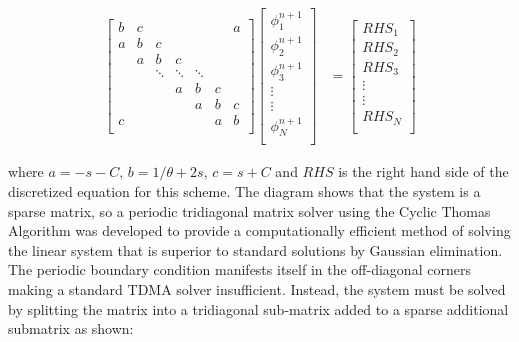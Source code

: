 \documentclass[twocolumn,10pt]{asme2ej}
\begin{document}
\begin{equation}
\begin{split}
\begin{bmatrix}
   { b } & { c } & {   }  & {   } & {   } & {   }& { a } \\
   { a } & { b } & { c }  & {   } & {   }  & {   } & {   }\\
   {   } &  { a } & { b } & { c }  & {   }  & {   } & {   }\\
   {   } & {   } & \ddots & \ddots  & \ddots & {   } &  {   } \\
   {   } & {   } & {   } & { a } & {b  } & {c  } & {   }\\
   {   } & {   } & {   } & {   } & {a  } & {b  } & { c }\\
   { c } & {   } & {   } & {   } & {   }  &  { a }  & { b }\\
\end{bmatrix}
\begin{bmatrix}
   {\phi_1^{n+1} }  \\
   {\phi_2^{n+1 }}  \\
   {\phi_3^{n+1} }  \\
   \vdots   \\
   \vdots   \\
   {\phi_N^{n+1} }  \\
\end{bmatrix}
& =
\begin{bmatrix}
   {RHS_1 }  \\
   {RHS_2 }  \\
   {RHS_3 }  \\
   \vdots   \\
   \vdots   \\
   {RHS_N }  \\
\end{bmatrix}
\end{split}
\label{TriPerSys}
\end{equation}

\noindent where $a = -s-C,\, b = 1/\theta+2s,\, c=s+C$ and $RHS$ is the right hand side of the discretized equation for this scheme.
\noindent The diagram shows that the system is a sparse matrix, so a periodic tridiagonal matrix solver using the Cyclic Thomas Algorithm was developed to provide a computationally efficient method of solving the linear system that is superior to standard solutions by Gaussian elimination.  The periodic boundary condition manifests itself in the off-diagonal corners making a standard TDMA solver insufficient.  Instead, the system must be solved by splitting the matrix into a tridiagonal sub-matrix added to a sparse additional submatrix as shown:  
\end{document}
